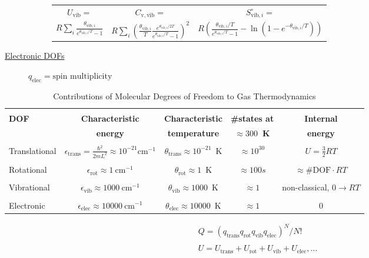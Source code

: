 \documentclass[11pt]{article}
\begin{document}
\begin{table}
\begin{center}
\begin{description}
\begin{description}
\begin{tabular}{ccc}
$ U_\mathrm{vib}= $ & $  C_\mathrm{v,vib} = $ & $S^\circ_{\mathrm{vib},i}=$ \\
$\displaystyle
R\sum_i\frac{\theta_{\mathrm{vib},i}}{e^{\theta_{\mathrm{vib},i}/T}-1}$ &
$\displaystyle R \sum_i \left (
  \frac{\theta_{\mathrm{vib},i}}{T}\frac{e^{\theta_{\mathrm{vib},i}/2T}}{e^{\theta_{\mathrm{vib},i}/T}-1}
\right )^2 $ & $\displaystyle R \left ( \frac{\theta_{\mathrm{vib},i}/T}{e^{\theta_{\mathrm{vib},i}/T}-1}
-\ln(1-e^{-\theta_{\mathrm{vib},i}/T})\right ) $ \\
\end{tabular}

\end{description}
\item[\underline{Electronic DOFs}] {}
$q_\mathrm{elec} = \text{spin multiplicity}$

\end{description}
\end{center}
\end{table}

\begin{table}
  \begin{center}
    \caption{\large{Contributions of Molecular Degrees of Freedom to Gas Thermodynamics}}
    \begin{tabular}{lcccc}
\hline \\
{\bf DOF}  & {\bf Characteristic} & {\bf Characteristic} & {\bf \#states at} & {\bf Internal }\\
        & {\bf energy}  & {\bf temperature} & {\bf $\approx 300$~K} & {\bf energy }\\
\hline \\
Translational & $\epsilon_\mathrm{trans} = \frac{\hbar^2}{2mL^2} \approx 10^{-21} \mathrm{cm}^{-1} $ &
$\theta_\mathrm{trans} \approx 10^{-21}$~K & $\approx 10^{30}$ & $U= \frac{3}{2}RT $  \\ \\
Rotational & $\epsilon_\mathrm{rot} \approx 1~\mathrm{cm}^{-1}$ & $\theta_\mathrm{rot} \approx 1$~K &
$\approx 100s$ & $\approx \mathrm{\#DOF}\cdot RT $\\ \\
Vibrational & $\epsilon_\mathrm{vib} \approx 1000~\mathrm{cm}^{-1} $ & $\theta_\mathrm{vib} \approx
1000$~K & $\approx 1$ & non-classical, $0\rightarrow RT$ \\ \\
Electronic & $\epsilon_\mathrm{elec} \approx 10000~\mathrm{cm}^{-1} $ & $\theta_\mathrm{elec} \approx
10000$~K & $\approx 1$ & 0\\
\hline
    \end{tabular}
\begin{eqnarray*}
Q = \left ( q_\mathrm{trans} q_\mathrm{rot} q_\mathrm{vib} q_\mathrm{elec} \right )^N/N! \\
 \\
U = U_\mathrm{trans} + U_\mathrm{rot} + U_\mathrm{vib} + U_\mathrm{elec}, \ldots
\end{eqnarray*}
  \end{center}

\end{table}
\end{document}
